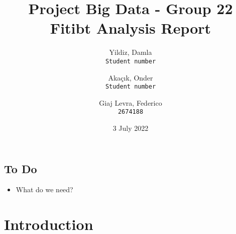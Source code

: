 \documentclass{report}
\title{Project Big Data - Group 22\\[2ex]
Fitibt Analysis Report}
\author{
  Yildiz, Damla\\
  \texttt{Student number}
  \and
  Akaçık, Onder\\
  \texttt{Student number}
  \and
  Giaj Levra, Federico\\
  \texttt{2674188}
}
\date{3 July 2022}
\begin{document}
\maketitle

\tableofcontents


\section*{To Do}

\begin{itemize}
    \item What do we need?
\end{itemize}

\chapter{Introduction}
\section{}

 
 
\end{document}
